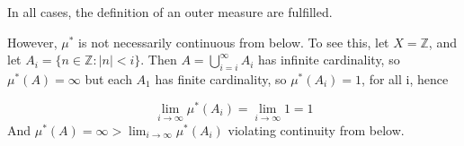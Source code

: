 \documentclass[11pt,oneside]{article}
\numberwithin{equation}{section}
\theoremstyle{definition}
\newtheorem{exercise}{Exercise}
\def\ZZ{\mathbb{Z}}
\begin{document}
\begin{solution}
\begin{enumerate}[(a)]
      In all cases, the definition of an outer measure are fulfilled.
  \end{enumerate}

  However, $\mu ^*$ is not necessarily continuous from below.  To see
  this, let $X = \ZZ$, and let $A_i = \{ n \in \ZZ : |n| < i \}$.
  Then $A = \bigcup \limits _ { i=i } ^ \infty A_i$ has infinite
  cardinality, so $\mu ^* ( A) = \infty$ but each $A_1$ has finite
  cardinality, so $\mu ^*(A_i) = 1$, for all i, hence

  $$ \lim _ { i \to \infty } \mu ^* (A_i) = \lim _ { i \to \infty} 1 = 1
  $$
  And $ \mu^* ( A) = \infty > \lim _ { i \to \infty } \mu ^* (A_i)$ violating
  continuity from below.  
  
\end{solution}

\begin{comment}
\begin{exercise}
  problem
\end{exercise}
\begin{solution}
\begin{enumerate}[(a)]
\item
  first answer
\end{enumerate}
\end{solution}
\end{comment}
\end{document}
